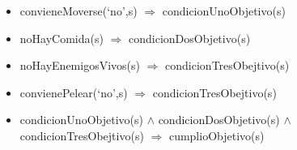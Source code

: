 \begin{itemize}
\item convieneMoverse(`no',s) $\Rightarrow$ condicionUnoObjetivo(s)

\item noHayComida(s) $\Rightarrow$ condicionDosObjetivo(s)
\item noHayEnemigosVivos(s) $\Rightarrow$ condicionTresObejtivo(s)
\item convienePelear(`no',s) $\Rightarrow$ condicionTresObejtivo(s)

\item  condicionUnoObjetivo(s) $\land$ condicionDosObjetivo(s)
$\land$ condicionTresObejtivo(s) $\Rightarrow$ cumplioObjetivo(s)

\end{itemize}



